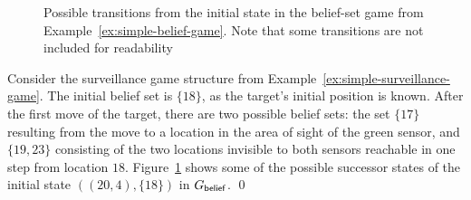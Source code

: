 

\begin{figure}


\vspace{-.3cm}
\caption{Possible transitions from the initial state in the belief-set game from Example~\ref{ex:simple-belief-game}. Note that some transitions are not included for readability}
\label{fig:simple-belief-game}
\vspace{-.5cm}
\end{figure}

\begin{example}\label{ex:simple-belief-game}
Consider the surveillance game structure from Example~\ref{ex:simple-surveillance-game}. The initial belief set is $\{18\}$, as the target's initial position is known. After the first move of the target, there are two possible belief sets: the set $\{17\}$ resulting from the move to a location in the area of sight of the green sensor, and $\{19,23\}$ consisting of the two locations invisible to both sensors reachable in one step from location $18$.
Figure~\ref{fig:simple-belief-game} shows some of the possible successor states of the initial state $((20,4),\{18\})$ in $G_{\mathsf{belief}}$. \qed
\end{example}

